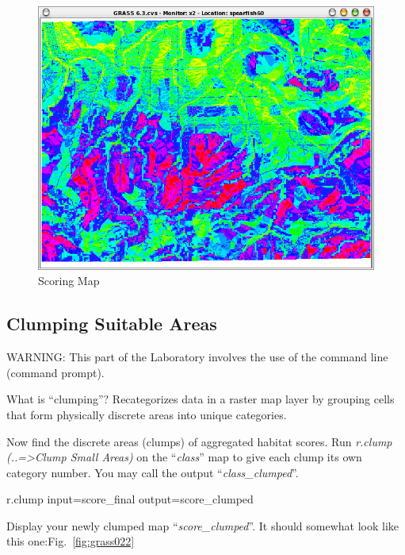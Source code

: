 \begin{figure}[htbp]
   \centering
   \includegraphics[scale=0.35]{grass021.png}
   \caption{Scoring Map}
   \label{fig:grass021}
\end{figure}

\subsection{Clumping Suitable Areas}
WARNING: This part of the Laboratory involves the use of the command line (command prompt).

What is ``clumping''?
Recategorizes data in a raster map layer by grouping cells that form physically discrete areas into unique categories.

Now find the discrete areas (clumps) of aggregated habitat scores. 
Run \textit{r.clump (..=>Clump Small Areas) }on the ``\textit{class}'' map to give each clump its own category number. You may call the output ``\textit{class\_clumped}''.

\begin{smallverbatim}
r.clump input=score_final output=score_clumped 
\end{smallverbatim}

Display your newly clumped map ``\textit{score\_clumped}''. It should somewhat look like this one:Fig.~\ref{fig:grass022}

